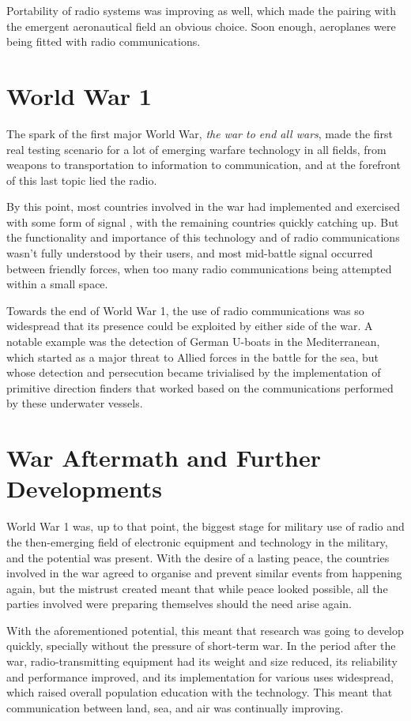 \documentclass[english,purist]{ist-report}
\begin{document}
Portability of radio systems was improving as well, which made the pairing with the emergent aeronautical field an obvious choice. Soon enough, aeroplanes were being fitted with radio communications.

\section{World War 1}

The spark of the first major World War, \textit{the war to end all wars}, made the first real testing scenario for a lot of emerging warfare technology in all fields, from weapons to transportation to information to communication, and at the forefront of this last topic lied the radio.

By this point, most countries involved in the war had implemented and exercised with some form of signal \jamming{}, with the remaining countries quickly catching up. But the functionality and importance of this technology and of radio communications wasn't fully understood by their users, and most mid-battle signal \jamming{} occurred between friendly forces, when too many radio communications being attempted within a small space.

Towards the end of World War 1, the use of radio communications was so widespread that its presence could be exploited by either side of the war. A notable example was the detection of German U-boats in the Mediterranean, which started as a major threat to Allied forces in the battle for the sea, but whose detection and persecution became trivialised by the implementation of primitive direction finders that worked based on the communications performed by these underwater vessels.

\section{War Aftermath and Further Developments}\label{sec:betweenwars}

World War 1 was, up to that point, the biggest stage for military use of radio and the then-emerging field of electronic equipment and technology in the military, and the potential was present. With the desire of a lasting peace, the countries involved in the war agreed to organise and prevent similar events from happening again, but the mistrust created meant that while peace looked possible, all the parties involved were preparing themselves should the need arise again.

With the aforementioned potential, this meant that research was going to develop quickly, specially without the pressure of short-term war. In the period after the war, radio-transmitting equipment had its weight and size reduced, its reliability and performance improved, and its implementation for various uses widespread, which raised overall population education with the technology. This meant that communication between land, sea, and air was continually improving.
\end{document}
